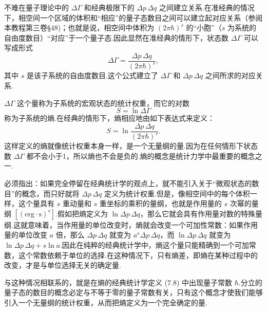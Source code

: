 不难在量子理论中的 $\Delta\Gamma$ 和经典极限下的 $\Delta p\,\Delta q$ 之间建立关系.在准经典的情况下，相空间一个区域的体积和“相应”的量子态数目之间可以建立起对应关系（参阅本教程第三卷§48)；也就是说，相空间中体积为 $(2\pi\hbar)^s$ 的“小胞”（$s$ 为系统的自由度数目）“对应”于一个量子态.因此显然在准经典的情形下，状态数 $\Delta\Gamma$ 可以写成形式
\begin{equation}
  \Delta\Gamma=\frac{\Delta p\,\Delta q}{(2\pi\hbar)^s},
\end{equation}
其中 $s$ 是该子系统的自由度数目.这个公式建立了 $\Delta\Gamma$ 和 $\Delta p\,\Delta q$ 之间所求的对应关系.

$\Delta\Gamma$ 这个量称为子系统的宏观状态的统计权重，而它的对数
\begin{equation}
  S=\ln\Delta\Gamma
\end{equation}
称为子系统的熵.在经典的情形下，熵相应地由如下表达式来定义：
\begin{equation}
  S=\ln\frac{\Delta p\,\Delta q}{(2\pi\hbar)^s}.
\end{equation}
这样定义的熵就像统计权重本身一样，是一个无量纲的量.因为在任何情形下状态数 $\Delta\Gamma$ 都不会小于1，所以熵也不会是负的.熵的概念是统计力学中最重要的概念之一.

必须指出：如果完全停留在经典统计学的观点上，就不能引入关于“微观状态的数目”的概念，而只好就将 $\Delta p\,\Delta q$ 定义为统计权重.但是，像相空间中的每个体积一样，这个量具有 $s$ 重动量和 $s$ 重坐标的乘积的量纲，也就是作用量的 $s$ 次幂的量纲 $[(\mathrm{erg}\cdot\mathrm{s})^s]$.假如把熵定义为 $\ln\Delta p\,\Delta q$，那么它就会具有作用量对数的特殊量纲.这就意味着，当作用量的单位改变时，熵就会改变一个可加性常数：如果作用量的单位改变 $a$ 倍，那么 $\Delta p\,\Delta q$ 就变为 $a^s\Delta p\,\Delta q$，而 $\ln\Delta p\,\Delta q$ 就变为 $\ln\Delta p\,\Delta q+s\ln a$.因此在纯粹的经典统计学中，熵这个量只能精确到一个可加常数，这个常数依赖于单位的选择.在这种情况下，只有熵差，即熵在某种过程中的改变，才是与单位选择无关的确定量.

与这种情况相联系的，就是在熵的经典统计学定义 (7.8) 中出现量子常数 $\hbar$.分立的量子态的数目的概念必定与不等于零的量子常数有关，只有这个概念才使我们能够引入一个无量纲的统计权重，从而把熵定义为一个完全确定的量.

